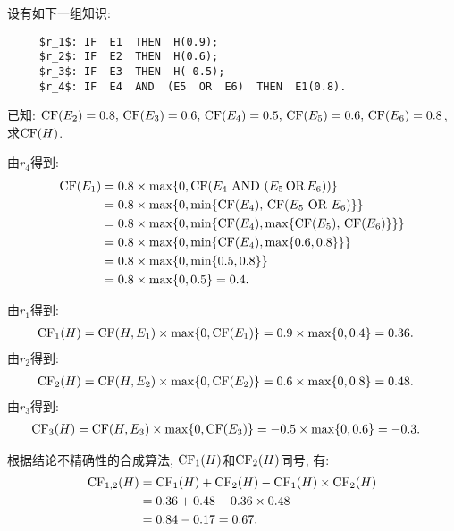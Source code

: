 \begin{example}
设有如下一组知识:
\begin{Verbatim}
     $r_1$: IF  E1  THEN  H(0.9);
     $r_2$: IF  E2  THEN  H(0.6);
     $r_3$: IF  E3  THEN  H(-0.5);
     $r_4$: IF  E4  AND  (E5  OR  E6)  THEN  E1(0.8).
\end{Verbatim}
已知: $\textup{CF}(E_2)=0.8,\, \textup{CF}(E_3)=0.6,\, \textup{CF}(E_4)=0.5,\, \textup{CF}(E_5)=0.6,\, \textup{CF}(E_6)=0.8$, 求$\textup{CF}(H)$.
\vspace{-0.2cm}
\end{example}
\begin{result}
由$r_4$得到:
\begin{align*}
    \textup{CF}(E_1)&=0.8\times \max\{ 0, \textup{CF}(E_4\,\, \textup{AND} \,\,  (E_5\,  \textup{OR}\,   E_6)) \}\\
          &=0.8\times \max\{ 0, \min\{\textup{CF}(E_4),\,  \textup{CF}(E_5\,\,   \textup{OR}\,\,    E_6)\} \}\\
          &=0.8\times \max\{ 0, \min\{\textup{CF}(E_4),  \max\{\textup{CF}(E_5),\,  \textup{CF}(E_6)\}\} \}\\
          &=0.8\times \max\{ 0, \min\{\textup{CF}(E_4),  \max\{0.6,  0.8\}\} \}\\
          &=0.8\times \max\{ 0, \min\{0.5,  0.8\} \}\\
          &=0.8\times \max\{ 0,  0.5 \} = 0.4.
\end{align*}
\end{result}
由$r_1$得到:
\begin{align*}
    \textup{CF}_1(H)&=\textup{CF}(H, E_1)\times \max\{0,  \textup{CF}(E_1)\}=0.9\times \max\{0,  0.4\} = 0.36.
\end{align*}
    由$r_2$得到:
\begin{align*}
    \textup{CF}_2(H)&=\textup{CF}(H, E_2)\times \max\{0,  \textup{CF}(E_2)\}=0.6\times \max\{0,  0.8\} = 0.48.
\end{align*}
由$r_3$得到:
\begin{align*}
    \textup{CF}_3(H)&=\textup{CF}(H, E_3)\times \max\{0,  \textup{CF}(E_3)\}=-0.5\times \max\{0,  0.6\} = -0.3.
\end{align*}

根据结论不精确性的合成算法, $\textup{CF}_1(H)$和$\textup{CF}_2(H)$同号, 有:
\begin{align}
  \begin{aligned}
  \textup{CF}_{1,2}(H) &=\textup{CF}_{1}(H)+\textup{CF}_{2}(H)-\textup{CF}_{1}(H) \times \textup{CF}_{2}(H) \\
  &=0.36+0.48-0.36 \times 0.48 \\
  &=0.84-0.17=0.67.
  \end{aligned}
\end{align}

